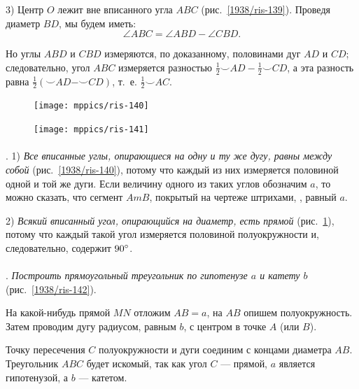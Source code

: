 \documentclass[oneside]{book}
\begin{document}
3) Центр $O$ лежит вне вписанного угла $ABC$ (рис.~\ref{1938/ris-139}).
Проведя диаметр $BD$, мы будем иметь:
\[\angle ABC=\angle ABD-\angle CBD.\]

Но углы $ABD$ и $CBD$ измеряются, по доказанному, половинами дуг $AD$ и $CD$;
следовательно, угол $ABC$ измеряется разностью
$\tfrac12{\smallsmile}AD-\tfrac12{\smallsmile}CD$, а эта разность равна $\tfrac12({\smallsmile}AD-{\smallsmile}CD)$, т.~е.
$\tfrac12{\smallsmile}AC$.

\begin{figure}[h]
\begin{minipage}{.48\textwidth}
\centering
\texttt{[image: mppics/ris-140]}
\caption{}\label{1938/ris-140}
\end{minipage}
\hfill
\begin{minipage}{.48\textwidth}
\centering
\texttt{[image: mppics/ris-141]}
\caption{}\label{1938/ris-141}
\end{minipage}
\end{figure}

\paragraph{}\label{1938/125}
. %
1) \emph{Все вписанные углы, опирающиеся на одну и ту же дугу, равны между собой} (рис.~\ref{1938/ris-140}), потому что каждый из них измеряется половиной одной и той же дуги.
Если величину одного из таких углов обозначим $a$, то можно сказать, что сегмент $AmB$, покрытый на чертеже штрихами, , равный $a$. 

2) \emph{Всякий вписанный угол, опирающийся на диаметр, есть прямой} (рис.~\ref{1938/ris-141}), потому что каждый такой угол измеряется половиной полуокружности и, следовательно, содержит $90\degree$.



\paragraph{}\label{1938/126}
.
\emph{Построить прямоугольный треугольник по гипотенузе $a$ и катету $b$} (рис.~\ref{1938/ris-142}).


На какой-нибудь прямой $MN$ отложим $AB=a$, на $AB$ опишем полуокружность.
Затем проводим дугу радиусом, равным $b$, с центром в точке $A$ (или $B$).

Точку пересечения $C$ полуокружности и дуги соединим с концами диаметра $AB$.
Треугольник $ABC$ будет искомый, так как угол $C$ — прямой, $a$ является гипотенузой, а $b$ — катетом.
\end{document}
